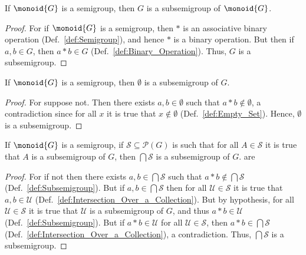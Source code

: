         \begin{theorem}
            \label{thm:Whole_Semigroup_is_Subsemigroup}%
            If $\monoid{G}$ is a semigroup, then $G$ is a subsemigroup of
            $\monoid{G}$.
        \end{theorem}
        \begin{proof}
            For if $\monoid{G}$ is a semigroup, then $*$ is an associative
            binary operation (Def.~\ref{def:Semigroup}), and hence $*$ is a
            binary operation. But then if $a,b\in{G}$, then $a*b\in{G}$
            (Def.~\ref{def:Binary_Operation}). Thus, $G$ is a subsemigroup.
        \end{proof}
        \begin{theorem}
            \label{thm:Emptyset_is_Subsemigroup}%
            If $\monoid{G}$ is a semigroup, then $\emptyset$ is a subsemigroup
            of $G$.
        \end{theorem}
        \begin{proof}
            For suppose not. Then there exists $a,b\in\emptyset$ such that
            $a*b\notin\emptyset$, a contradiction since for all $x$ it is true
            that $x\notin\emptyset$ (Def.~\ref{def:Empty_Set}). Hence,
            $\emptyset$ is a subsemigroup.
        \end{proof}
        \begin{theorem}
            \label{thm:Intersection_of_Subsemigroups_is_Subsemigroup}%
            If $\monoid{G}$ is a semigroup, if
            $\mathcal{S}\subseteq\mathcal{P}(G)$ is such that for all
            $A\in\mathcal{S}$ it is true that $A$ is a subsemigroup of $G$,
            then $\bigcap\mathcal{S}$ is a subsemigroup of $G$. are
        \end{theorem}
        \begin{proof}
            For if not then there exists $a,b\in\bigcap\mathcal{S}$ such that
            $a*b\notin\bigcap\mathcal{S}$ (Def.~\ref{def:Subsemigroup}). But if
            $a,b\in\bigcap\mathcal{S}$ then for all $\mathcal{U}\in\mathcal{S}$
            it is true that $a,b\in\mathcal{U}$
            (Def.~\ref{def:Intersection_Over_a_Collection}). But by hypothesis,
            for all $\mathcal{U}\in\mathcal{S}$ it is true that $\mathcal{U}$
            is a subsemigroup of $G$, and thus $a*b\in\mathcal{U}$
            (Def.~\ref{def:Subsemigroup}). But if $a*b\in\mathcal{U}$ for all
            $\mathcal{U}\in\mathcal{S}$, then $a*b\in\bigcap\mathcal{S}$
            (Def.~\ref{def:Intersection_Over_a_Collection}), a contradiction.
            Thus, $\bigcap\mathcal{S}$ is a subsemigroup.
        \end{proof}
